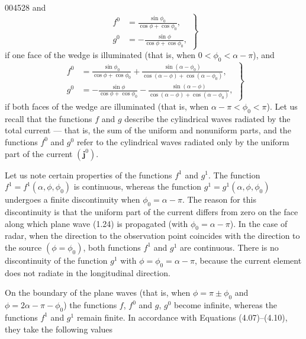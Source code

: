 \begin{scanpage}{0045}{28}
and
\[\left.\begin{aligned}f^0&=\frac{\sin\phi_0}{\cos\phi+\cos\phi_0},\\g^0&=-\frac{\sin\phi}{\cos\phi+\cos\phi_0},\end{aligned}\right\}\tag{4.09}\]
if one face of the wedge is illuminated (that is, when $0<\phi_0<\alpha-\pi$), and
\[\left.\begin{aligned}f^0&=\frac{\sin\phi_0}{\cos\phi+\cos\phi_0}+\frac{\sin(\alpha-\phi_0)}{\cos(\alpha-\phi)+\cos(\alpha-\phi_0)},\\g^0&=-\frac{\sin\phi}{\cos\phi+\cos\phi_0}-\frac{\sin(\alpha-\phi)}{\cos(\alpha-\phi)+\cos(\alpha-\phi_0)},\end{aligned}\right\}\tag{4.10}\]
if both faces of the wedge are illuminated (that is, when $\alpha-\pi<\phi_0<\pi$). Let us recall that the functions $f$ and $g$ describe the cylindrical waves radiated by the total current --- that is, the sum of the uniform and nonuniform parts, and the functions $f^0$ and $g^0$ refer to the cylindrical waves radiated only by the uniform part of the current $(\mathbf j^0)$.

Let us note certain properties of the functions $f^1$ and $g^1$. The function $f^1=f^1(\alpha,\phi,\phi_0)$ is continuous, whereas the function $g^1=g^1(\alpha,\phi,\phi_0)$ undergoes a finite discontinuity when $\phi_0=\alpha-\pi$. The reason for this discontinuity is that the uniform part of the current differs from zero on the face along which plane wave (1.24) is propagated (with $\phi_0=\alpha-\pi$). In the case of radar, when the direction to the observation point coincides with the direction to the source $(\phi=\phi_0)$, both functions $f^1$ and $g^1$ are continuous. There is no discontinuity of the function $g^1$ with $\phi=\phi_0=\alpha-\pi$, because the current element does not radiate in the longitudinal direction.

On the boundary of the plane waves (that is, when $\phi=\pi\pm\phi_0$ and $\phi=2\alpha-\pi-\phi_0$) the functions $f$, $f^0$ and $g$, $g^0$ become infinite, whereas the functions $f^1$ and $g^1$ remain finite. In accordance with Equations (4.07)--(4.10), they take the following values
\end{scanpage}
